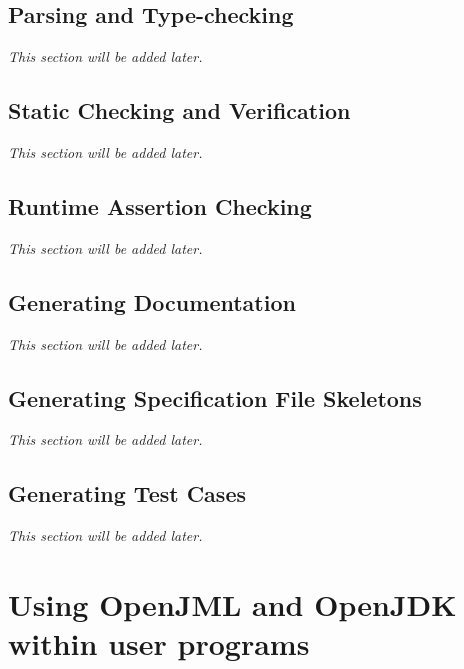 \documentclass{report}%
\begin{document}
\section{Parsing and Type-checking}
\textit{This section will be added later.} %

\section{Static Checking and Verification}
\textit{This section will be added later.} %

\section{Runtime Assertion Checking}
\textit{This section will be added later.} %

\section{Generating Documentation}
\textit{This section will be added later.} %

\section{Generating Specification File Skeletons}
\textit{This section will be added later.} %

\section{Generating Test Cases}
\textit{This section will be added later.} %

\chapter{Using OpenJML and OpenJDK within user programs}
\end{document}
